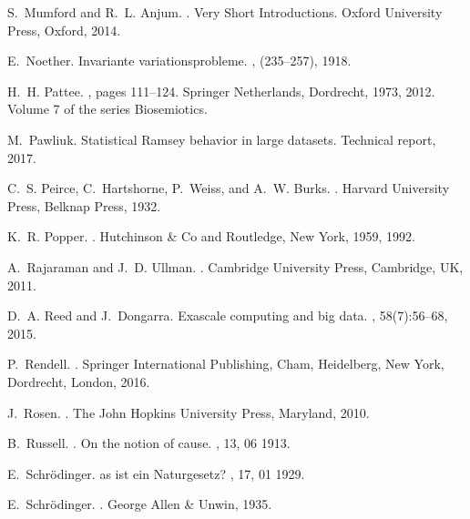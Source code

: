 \documentclass[12pt]{article}
\begin{document}
\begin{thebibliography}{10}
S.~Mumford and R.~L. Anjum.
.
\newblock Very Short Introductions. Oxford University Press, Oxford, 2014.

E.~Noether.
\newblock Invariante variationsprobleme.
, (235--257), 1918.

H.~H. Pattee.
, pages 111--124.
\newblock Springer Netherlands, Dordrecht, 1973, 2012.
\newblock Volume 7 of the series Biosemiotics.

M.~Pawliuk.
\newblock Statistical {R}amsey behavior in large datasets.
\newblock Technical report, 2017.

C.~S. Peirce, C.~Hartshorne, P.~Weiss, and A.~W. Burks.
.
\newblock Harvard University Press, Belknap Press, 1932.

K.~R. Popper.
.
\newblock Hutchinson \& Co and Routledge, New York, 1959, 1992.

A.~Rajaraman and J.~D. Ullman.
.
\newblock Cambridge University Press, Cambridge, UK, 2011.

D.~A. Reed and J.~Dongarra.
\newblock Exascale computing and big data.
, 58(7):56--68, 2015.

P.~Rendell.
.
\newblock Springer International Publishing, Cham, Heidelberg, New York,
  Dordrecht, London, 2016.

J.~Rosen.
.
\newblock The John Hopkins University Press, Maryland, 2010.

B.~Russell.
.  {O}n the notion of cause.
, 13, 06
  1913.

E.~Schr\"odinger.
as ist ein {N}aturgesetz?
, 17, 01 1929.

E.~Schr\"odinger.
.
\newblock George Allen \& Unwin, 1935.


\end{thebibliography}
\end{document}
